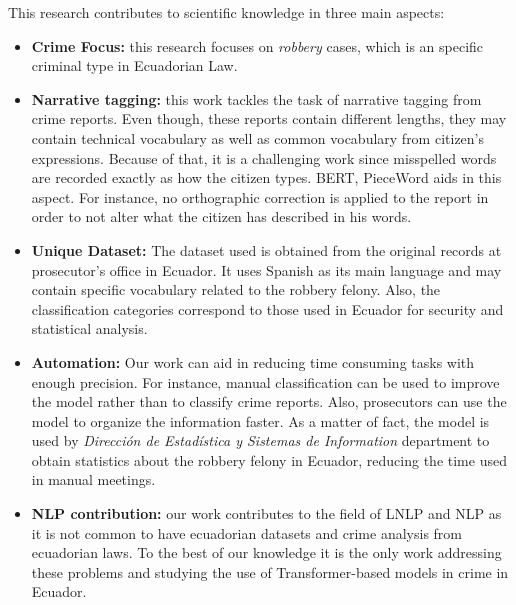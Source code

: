 \documentclass[onecolumn, journal, english, 12pt, a4paper]{IEEEtran} %
\theoremstyle{definition}
\begin{document}
This research contributes to scientific knowledge in three main
aspects:
\begin{itemize}
\item \textbf{Crime Focus:} this research focuses on \textit{robbery}
  cases, which is an specific criminal type in Ecuadorian Law.
\item \textbf{Narrative tagging:} this work tackles the task of
  narrative tagging from crime reports. Even though, these reports
  contain different lengths, they may contain technical vocabulary as
  well as common vocabulary from citizen's expressions. Because of
  that, it is a challenging work since misspelled words are recorded
  exactly as how the citizen types. BERT, PieceWord aids in this
  aspect. For instance, no orthographic correction is applied to the
  report in order to not alter what the citizen has described in his
  words.
\item \textbf{Unique Dataset:} The dataset used is obtained from the
  original records at prosecutor's office in Ecuador. It uses Spanish
  as its main language and may contain specific vocabulary related to
  the robbery felony. Also, the classification categories correspond
  to those used in Ecuador for security and statistical analysis.
\item \textbf{Automation: } Our work can aid in reducing time
  consuming tasks with enough precision. For instance, manual
  classification can be used to improve the model rather than to
  classify crime reports. Also, prosecutors can use the model to
  organize the information faster. As a matter of fact, the model is
  used by \textit{Dirección de Estadística y Sistemas de Information}
  department to obtain statistics about the robbery felony in Ecuador,
  reducing the time used in manual meetings. 
\item  \textbf{NLP contribution:} our work contributes to the field of
  LNLP and NLP as it is not common to have ecuadorian datasets and crime
  analysis from ecuadorian laws. To the best of our knowledge it is
  the only work addressing these problems and studying the use of
  Transformer-based models in crime in Ecuador.
\end{itemize}




\end{document}

